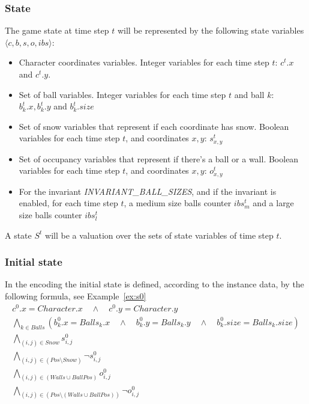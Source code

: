 \documentclass{report}
\theoremstyle{plain}
\begin{document}
\subsubsection{State}
The game state at time step $t$ will be represented by the following state variables $\langle c, b, s, o, ibs\rangle$:
\begin{itemize}
\item Character coordinates variables. Integer variables for each time step $t$: $c^t.x$ and $c^t.y$.
\item Set of ball variables. Integer variables for each time step $t$ and ball $k$: $b_k^t.x, b_k^t.y$ and $b_k^t.size$ 
\item Set of snow variables that represent if each coordinate has snow. Boolean variables for each time step $t$, and coordinates $x,y$: $s_{x,y}^t$
\item Set of occupancy variables that represent if there's a ball or a wall. Boolean variables for each time step $t$, and coordinates $x,y$: $o_{x,y}^t$
\item For the invariant \textit{INVARIANT\_BALL\_SIZES}, and if the invariant is enabled, for each time step $t$, a medium size balls counter $ibs_m^t$ and a large size balls counter $ibs_l^t$
\end{itemize}

A state $S^t$ will be a valuation over the sets of state variables of time step $t$.

\subsubsection{Initial state}
In the encoding the initial state is defined, according to the instance data, by the following formula, see Example~\ref{ex:s0}
\begin{gather*}
c^0.x = Character.x \quad \wedge \quad c^0.y = Character.y \\
\bigwedge \limits_{k \in Balls} (b_k^0.x = Balls_k.x \quad \wedge \quad b_k^0.y = Balls_k.y \quad \wedge \quad b_k^0.size = Balls_k.size) \\
\bigwedge \limits_{(i, j) \in Snow} s_{i, j}^0 \\
\bigwedge \limits_{(i, j) \in (Pos \setminus Snow)} \lnot s_{i, j}^0 \\
\bigwedge \limits_{(i, j) \in (Walls\cup BallPos)} o_{i,j}^0 \\
\bigwedge \limits_{(i, j) \in (Pos \setminus (Walls \cup  BallPos))} \lnot o_{i,j}^0 
\end{gather*}
\end{document}
